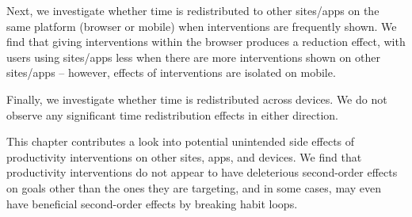 Next, we investigate whether time is redistributed to other sites/apps on the same platform (browser or mobile) when interventions are frequently shown. We find that giving interventions within the browser produces a reduction effect, with users using sites/apps less when there are more interventions shown on other sites/apps -- however, effects of interventions are isolated on mobile. %

Finally, we investigate whether time is redistributed across devices. We do not observe any significant time redistribution effects in either direction.


This chapter contributes a look into potential unintended side effects of productivity interventions on other sites, apps, and devices. We find that productivity interventions do not appear to have deleterious second-order effects on goals other than the ones they are targeting, and in some cases, may even have beneficial second-order effects by breaking habit loops.

